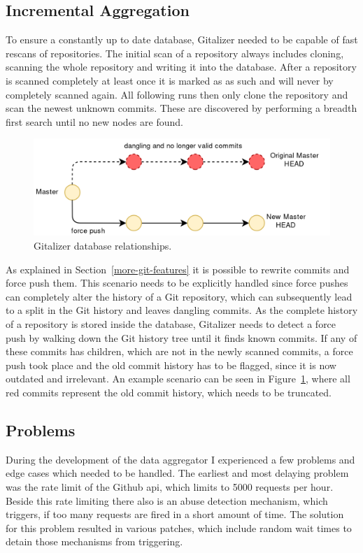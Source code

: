\subsection{Incremental Aggregation}
To ensure a constantly up to date database, Gitalizer needed to be capable of fast rescans of repositories.
The initial scan of a repository always includes cloning, scanning the whole repository and writing it into the database.
After a repository is scanned completely at least once it is marked as as such and will never by completely scanned again.
All following runs then only clone the repository and scan the newest unknown commits.
These are discovered by performing a breadth first search until no new nodes are found.

\begin{figure}[H]
\includegraphics[scale=0.3]{./graphs/git-history-rewrite}
\centering
\caption{Gitalizer database relationships.}\label{fig:gitalizer-relationship}
\end{figure}

As explained in Section~\ref{more-git-features} it is possible to rewrite commits and force push them.
This scenario needs to be explicitly handled since force pushes can completely alter the history of a Git repository, which can subsequently lead to a split in the Git history and leaves dangling commits.
As the complete history of a repository is stored inside the database, Gitalizer needs to detect a force push by walking down the Git history tree until it finds known commits.
If any of these commits has children, which are not in the newly scanned commits, a force push took place and the old commit history has to be flagged, since it is now outdated and irrelevant.
An example scenario can be seen in Figure~\ref{fig:gitalizer-relationship}, where all red commits represent the old commit history, which needs to be truncated.


\subsection{Problems}
During the development of the data aggregator I experienced a few problems and edge cases which needed to be handled.
The earliest and most delaying problem was the rate limit of the Github \ac{api}, which limits to 5000 requests per hour.
Beside this rate limiting there also is an abuse detection mechanism, which triggers, if too many requests are fired in a short amount of time.
The solution for this problem resulted in various patches, which include random wait times to detain those mechanisms from triggering.

